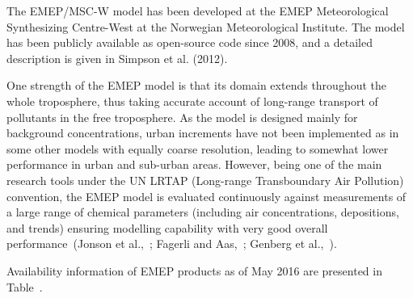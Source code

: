 \documentclass[9pt]{report}
\begin{document}
\noindent{}The EMEP/MSC-W model has been developed at the EMEP Meteorological Synthesizing Centre-West at the Norwegian Meteorological Institute. 
The model has been publicly available as open-source code since 2008, and a detailed description is given in Simpson et al. (2012).%

One strength of the EMEP model is that its domain extends throughout the whole troposphere, thus taking accurate account of long-range transport of pollutants in the free troposphere. 
As the model is designed mainly for background concentrations, urban increments have not been implemented as in some other models with equally coarse resolution, leading to somewhat lower performance in urban and sub-urban areas. 
However, being one of the main research tools under the UN LRTAP (Long-range Transboundary Air Pollution) convention, the EMEP model is evaluated continuously against measurements of a large range of chemical parameters (including air concentrations, depositions, and trends) ensuring modelling capability with very good overall performance~(Jonson et al.,~; Fagerli and Aas,~; Genberg et al.,~).%

Availability information of EMEP products as of May 2016 are presented in Table~.%
\end{document}

